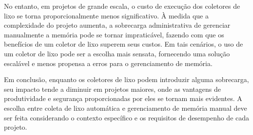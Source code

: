 \documentclass{article}
\begin{document}
    No entanto, em projetos de grande escala, o custo de execução dos coletores de lixo se torna proporcionalmente
    menos significativo. À medida que a complexidade do projeto aumenta, a sobrecarga administrativa de gerenciar
    manualmente a memória pode se tornar impraticável, fazendo com que os benefícios de um coletor de lixo superem
    seus custos. Em tais cenários, o uso de um coletor de lixo pode ser a escolha mais sensata, fornecendo uma solução
    escalável e menos propensa a erros para o gerenciamento de memória.

    Em conclusão, enquanto os coletores de lixo podem introduzir alguma sobrecarga, seu impacto tende a diminuir
    em projetos maiores, onde as vantagens de produtividade e segurança proporcionadas por eles se tornam mais evidentes.
    A escolha entre coleta de lixo automática e gerenciamento de memória manual deve ser feita considerando o contexto
    específico e os requisitos de desempenho de cada projeto.
\end{document}
